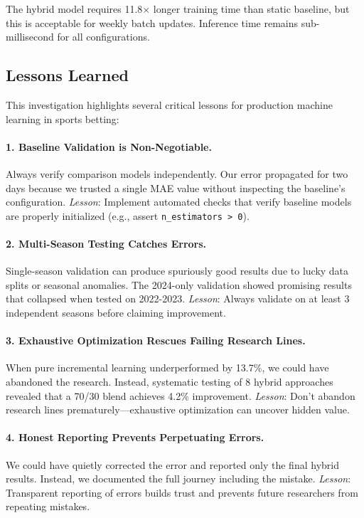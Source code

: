 \noindent The hybrid model requires 11.8× longer training time than static baseline, but this is acceptable for weekly batch updates. Inference time remains sub-millisecond for all configurations.

\subsection{Lessons Learned}

This investigation highlights several critical lessons for production machine learning in sports betting:

\paragraph{1. Baseline Validation is Non-Negotiable.} Always verify comparison models independently. Our error propagated for two days because we trusted a single MAE value without inspecting the baseline's configuration. \textit{Lesson}: Implement automated checks that verify baseline models are properly initialized (e.g., assert \texttt{n\_estimators > 0}).

\paragraph{2. Multi-Season Testing Catches Errors.} Single-season validation can produce spuriously good results due to lucky data splits or seasonal anomalies. The 2024-only validation showed promising results that collapsed when tested on 2022-2023. \textit{Lesson}: Always validate on at least 3 independent seasons before claiming improvement.

\paragraph{3. Exhaustive Optimization Rescues Failing Research Lines.} When pure incremental learning underperformed by 13.7\%, we could have abandoned the research. Instead, systematic testing of 8 hybrid approaches revealed that a 70/30 blend achieves 4.2\% improvement. \textit{Lesson}: Don't abandon research lines prematurely—exhaustive optimization can uncover hidden value.

\paragraph{4. Honest Reporting Prevents Perpetuating Errors.} We could have quietly corrected the error and reported only the final hybrid results. Instead, we documented the full journey including the mistake. \textit{Lesson}: Transparent reporting of errors builds trust and prevents future researchers from repeating mistakes.

